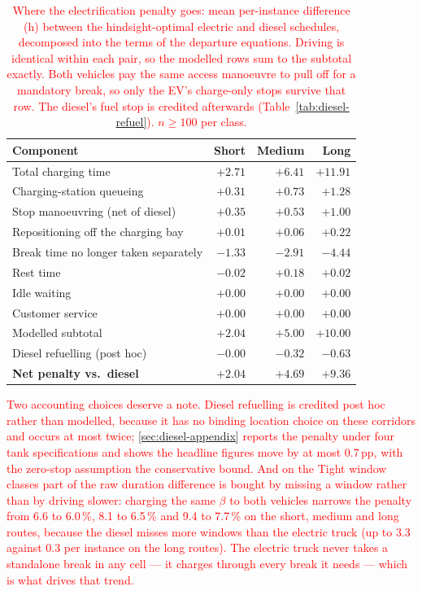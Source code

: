 \documentclass[preprint,12pt,3p]{elsarticle}
\newcommand{\red}[1]{\textcolor{red}{#1}}
\begin{document}
\begin{table}[ht]\centering
\caption{\red{Where the electrification penalty goes: mean per-instance difference (h) between the hindsight-optimal electric and diesel schedules, decomposed into the terms of the departure equations. Driving is identical within each pair, so the modelled rows sum to the subtotal exactly. Both vehicles pay the same access manoeuvre to pull off for a mandatory break, so only the EV's charge-only stops survive that row. The diesel's fuel stop is credited afterwards (Table~\ref{tab:diesel-refuel}). $n \geq 100$ per class.}}
\label{tab:diesel-decomp}
\begin{tabular}{lrrr}
\hline
Component & Short & Medium & Long \\
\hline
Total charging time & $+2.71$ & $+6.41$ & $+11.91$ \\
Charging-station queueing & $+0.31$ & $+0.73$ & $+1.28$ \\
Stop manoeuvring (net of diesel) & $+0.35$ & $+0.53$ & $+1.00$ \\
Repositioning off the charging bay & $+0.01$ & $+0.06$ & $+0.22$ \\
Break time no longer taken separately & $-1.33$ & $-2.91$ & $-4.44$ \\
Rest time & $-0.02$ & $+0.18$ & $+0.02$ \\
Idle waiting & $+0.00$ & $+0.00$ & $+0.00$ \\
Customer service & $+0.00$ & $+0.00$ & $+0.00$ \\
\hline
Modelled subtotal & $+2.04$ & $+5.00$ & $+10.00$ \\
Diesel refuelling (post hoc) & $-0.00$ & $-0.32$ & $-0.63$ \\
\hline
\textbf{Net penalty vs.\ diesel} & $\mathbf{+2.04}$ & $\mathbf{+4.69}$ & $\mathbf{+9.36}$ \\
\hline
\end{tabular}
\end{table}

\red{Two accounting choices deserve a note. Diesel refuelling is credited post
hoc rather than modelled, because it has no binding location choice on these
corridors and occurs at most twice; \ref{sec:diesel-appendix} reports the
penalty under four tank specifications and shows the headline figures move by at
most 0.7\,pp, with the zero-stop assumption the conservative bound. And on the
Tight window classes part of the raw duration difference is bought by missing a
window rather than by driving slower: charging the same $\beta$ to both vehicles
narrows the penalty from 6.6 to 6.0\,\%, 8.1 to 6.5\,\% and 9.4 to 7.7\,\% on
the short, medium and long routes, because the diesel misses more windows than
the electric truck (up to 3.3 against 0.3 per instance on the long routes). The
electric truck never takes a standalone break in any cell --- it charges through
every break it needs --- which is what drives that trend.}
\end{document}
